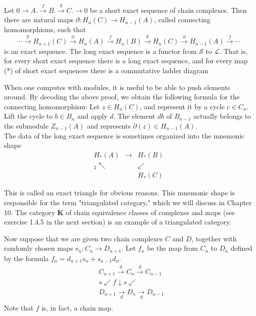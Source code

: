 \begin{example}
  
  \begin{theo}
      Let $0 \rightarrow A . \xrightarrow{f} B . \xrightarrow{g} C . \rightarrow 0$ be a short exact sequence of chain complexes. Then there are natural maps $\partial: H_n(C) \rightarrow H_{n-1}(A)$, called connecting homomorphisms, such that
      $$
      \cdots \xrightarrow{g} H_{n+1}(C) \xrightarrow{\partial} H_n(A) \xrightarrow{f} H_n(B) \xrightarrow{g} H_n(C) \xrightarrow{\partial} H_{n-1}(A) \xrightarrow{f} \cdots
      $$
      is an exact sequence. The long exact sequence is a functor from $\mathcal{S}$ to $\mathcal{L}$. That is, for every short exact sequence there is a long exact sequence, and for every map (*) of short exact sequences there is a commutative ladder diagram
      \end{theo}
      
      When one computes with modules, it is useful to be able to push elements around. By decoding the above proof, we obtain the following formula for the connecting homomorphism: Let $z \in H_n(C)$, and represent it by a cycle $c \in C_n$. Lift the cycle to $b \in B_n$ and apply $d$. The element $d b$ of $B_{n-1}$ actually belongs to the submodule $Z_{n-1}(A)$ and represents $\partial(z) \in H_{n-1}(A)$.\\

The data of the long exact sequence is sometimes organized into the mnemonic shape
      $$
      \begin{array}{ccc}
      H_*(A) & \longrightarrow & H_*(B) \\
      { }_2 \nwarrow & & \swarrow \\
      & & H_*(C)
      \end{array}
      $$
      
      This is called an exact triangle for obvious reasons. This mnemonic shape is responsible for the term "triangulated category," which we will discuss in Chapter 10. The category $\mathbf{K}$ of chain equivalence classes of complexes and maps (see exercise 1.4.5 in the next section) is an example of a triangulated category.


      Now suppose that we are given two chain complexes $C$ and $D$, together with randomly chosen maps $s_n: C_n \rightarrow D_{n+1}$. Let $f_n$ be the map from $C_n$ to $D_n$ defined by the formula $f_n=d_{n+1} s_n+s_{n-1} d_n$.
      $$
      \begin{aligned}
      & C_{n+1} \xrightarrow{d} C_n \xrightarrow{d} C_{n-1} \\
      & s \swarrow f \downarrow s \swarrow \\
      & D_{n+1} \underset{d}{\longrightarrow} D_n \underset{d}{\longrightarrow} D_{n-1} \\
      &
      \end{aligned}
      $$ Note that $f$ is, in fact, a chain map.


\end{example}
